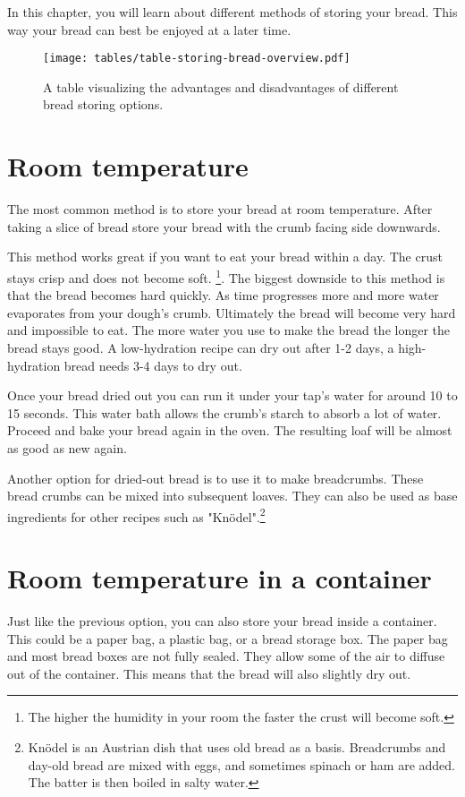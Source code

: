 In this chapter, you will learn about different
methods of storing your bread. This way
your bread can best be enjoyed at a later
time.

\begin{figure}[!htb]
  \texttt{[image: tables/table-storing-bread-overview.pdf]}
  \caption{A table visualizing the advantages and disadvantages
  of different bread storing options.}
  \label{table:bread-storage}
\end{figure}

\section{Room temperature}

The most common method is to store your bread
at room temperature. After taking a slice of bread
store your bread with the crumb facing side
downwards.

This method works great if you want to eat
your bread within a day. The crust stays
crisp and does not become soft. \footnote{
  The higher the humidity in your room the faster
  the crust will become soft.
}. The biggest downside to this method is that
the bread becomes hard quickly. As time progresses
more and more water evaporates from your dough's
crumb. Ultimately the bread will become very hard
and impossible to eat. The more water you use
to make the bread the longer the bread stays good.
A low-hydration recipe can dry out after 1-2 days,
a high-hydration bread needs 3-4 days to dry out.

Once your bread dried out you can run it under
your tap's water for around 10 to 15 seconds. 
This water bath allows the
crumb's starch to absorb a lot of water. Proceed and
bake your bread again in the oven. The resulting loaf
will be almost as good as new again.

Another option for dried-out bread is to use it
to make breadcrumbs. These bread crumbs can be mixed
into subsequent loaves. They can also be used as
base ingredients for other recipes such as "Knödel".\footnote{
  Knödel is an Austrian dish that uses old bread as a basis.
  Breadcrumbs and day-old bread are mixed with eggs, and sometimes
  spinach or ham are added. The batter is then boiled in salty water.
}

\section{Room temperature in a container}

Just like the previous option, you can also store your
bread inside a container. This could be a paper bag, 
a plastic bag, or a bread storage box. The paper bag and
most bread boxes are not fully sealed. They allow some of
the air to diffuse out of the container. This means that
the bread will also slightly dry out.

